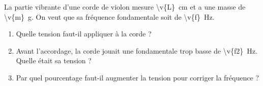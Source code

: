 La partie vibrante d'une corde de violon mesure \qty{\v{L}}{cm} et a une masse de \qty{\v{m}}{g}. On veut que sa fréquence fondamentale soit de \qty{\v{f}}{Hz}.

\begin{enumerate}[label=\alph*)]
    \item Quelle tension faut-il appliquer à la corde ?
    \item Avant l'accordage, la corde jouait une fondamentale trop basse de \qty{\v{f2}}{Hz}. Quelle était sa tension ?
    \item Par quel pourcentage faut-il augmenter la tension pour corriger la fréquence ?
\end{enumerate}

